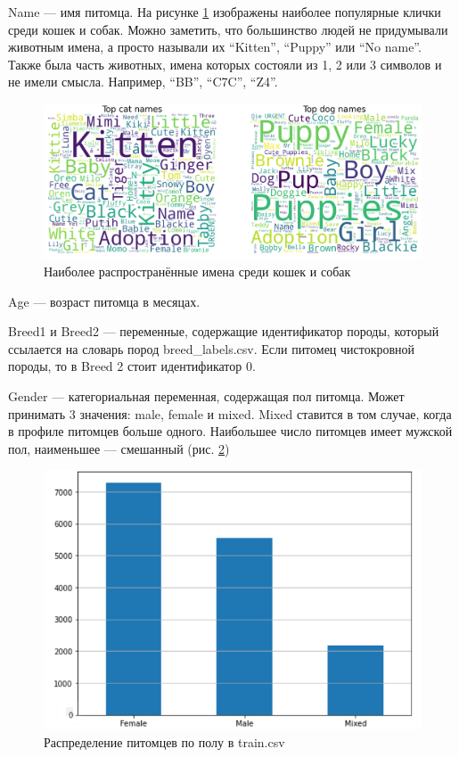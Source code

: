 \documentclass[14pt]{mmcs_article}
\begin{document}
Name --- имя питомца. На рисунке \ref{analyse:names} изображены наиболее популярные клички среди кошек и собак. Можно заметить, что большинство людей не придумывали животным имена, а просто называли их “Kitten”, “Puppy” или “No name”. Также была часть животных, имена которых состояли из 1, 2 или 3 символов и не имели смысла. Например, “BB”, “C7C”, “Z4”. 

\begin{figure}[H]
	\centering
	\includegraphics[scale=0.5]{names.png}
	\caption{Наиболее распространённые имена среди кошек и собак}\label{analyse:names}
\end{figure}

Age --- возраст питомца в месяцах.

Breed1 и Breed2 --- переменные, содержащие идентификатор породы, который ссылается на словарь пород breed\_labels.csv. Если питомец чистокровной породы, то в Breed 2 стоит идентификатор 0.

Gender --- категориальная переменная, содержащая пол питомца. Может принимать 3 значения: male, female и mixed. Mixed ставится в том случае, когда в профиле питомцев больше одного. Наибольшее число питомцев имеет мужской пол, наименьшее — смешанный (рис. \ref{analyse:gender})

\begin{figure}[H]
	\centering
	\includegraphics[scale=0.8]{gender.png}
	\caption{Распределение питомцев по полу в train.csv}\label{analyse:gender}
\end{figure}
\end{document}

